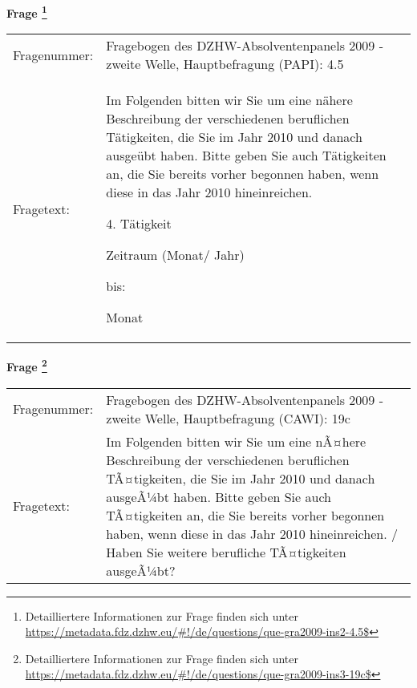 				\vspace*{0.5cm}
                \noindent\textbf{Frage
	                \footnote{Detailliertere Informationen zur Frage finden sich unter
		              \url{https://metadata.fdz.dzhw.eu/\#!/de/questions/que-gra2009-ins2-4.5$}}}\\
				\begin{tabularx}{\hsize}{@{}lX}
					Fragenummer: &
					  Fragebogen des DZHW-Absolventenpanels 2009 - zweite Welle, Hauptbefragung (PAPI):
					  4.5
 \\
					Fragetext: & Im Folgenden bitten wir Sie um eine nähere Beschreibung der verschiedenen beruflichen Tätigkeiten, die Sie im Jahr 2010 und danach ausgeübt haben. Bitte geben Sie auch Tätigkeiten an, die Sie bereits vorher begonnen haben, wenn diese in das Jahr 2010 hineinreichen.\par  4. Tätigkeit\par  Zeitraum (Monat/ Jahr)\par  bis:\par  Monat \\
				\end{tabularx}
				\vspace*{0.5cm}
                \noindent\textbf{Frage
	                \footnote{Detailliertere Informationen zur Frage finden sich unter
		              \url{https://metadata.fdz.dzhw.eu/\#!/de/questions/que-gra2009-ins3-19c$}}}\\
				\begin{tabularx}{\hsize}{@{}lX}
					Fragenummer: &
					  Fragebogen des DZHW-Absolventenpanels 2009 - zweite Welle, Hauptbefragung (CAWI):
					  19c
 \\
					Fragetext: & Im Folgenden bitten wir Sie um eine nÃ¤here Beschreibung der verschiedenen beruflichen TÃ¤tigkeiten, die Sie im Jahr 2010 und danach ausgeÃ¼bt haben. Bitte geben Sie auch TÃ¤tigkeiten an, die Sie bereits vorher begonnen haben, wenn diese in das Jahr 2010 hineinreichen. / Haben Sie weitere berufliche TÃ¤tigkeiten ausgeÃ¼bt? \\
				\end{tabularx}





